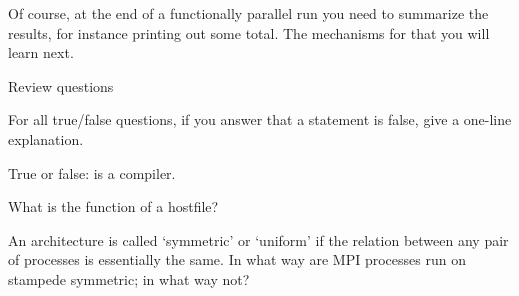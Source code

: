 Of course, at the end of a functionally parallel run you need to
summarize the results, for instance printing out some total.
The mechanisms for that you will learn next.

 {Review questions}

For all true/false questions, if you answer that a statement is false,
give a one-line explanation.

\begin{exercise}
  \label{ex:m1}
  True or false:  is a compiler.
\end{exercise}

\begin{exercise}
  What is the function of a hostfile?
\end{exercise}

\begin{pcse}
\begin{exercise}
    An architecture is called `symmetric' or `uniform' if the
    relation between any pair of processes is essentially the same.
    In what way are MPI processes run on stampede symmetric; in what way
    not?
\end{exercise}
\end{pcse}

